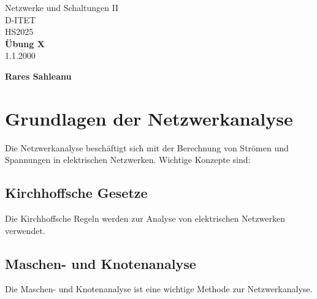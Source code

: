 \documentclass[11pt,a4paper]{article}
\title{}
\date{}  %
\begin{document}
\begin{titlepage}
    \centering
    {\Huge Netzwerke und Schaltungen II}\\[0.8cm]
    {\Large D-ITET}\\[0.8cm]
    {\Large HS2025}\\[3.5cm]
    
    {\Huge \textbf{Übung X}}\\[1cm]
    {\Large 1.1.2000}\\[3.5cm]


    \vfill
    {\Large \textbf{Rares Sahleanu}}
\end{titlepage}

\newpage
\tableofcontents

\newpage
\pagestyle{fancy}  


\fancyfoot[L]{}  
\fancyfoot[C]{\thepage}
\fancyfoot[R]{}

\renewcommand{\headrulewidth}{0.4pt}  
\renewcommand{\footrulewidth}{0pt}  

\section{Grundlagen der Netzwerkanalyse}
Die Netzwerkanalyse beschäftigt sich mit der Berechnung von Strömen und Spannungen in elektrischen Netzwerken. Wichtige Konzepte sind:

\subsection{Kirchhoffsche Gesetze}
Die Kirchhoffsche Regeln werden zur Analyse von elektrischen Netzwerken verwendet.

\subsection{Maschen- und Knotenanalyse}
Die Maschen- und Knotenanalyse ist eine wichtige Methode zur Netzwerkanalyse.
\end{document}
